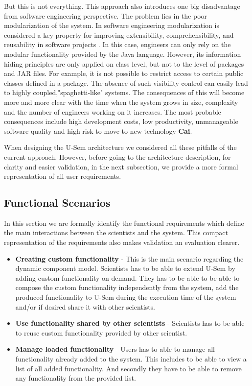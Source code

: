 But this is not everything. This approach also introduces one big disadvantage from software engineering perspective. The problem lies in the poor modularization of the system. In software engineering modularization is considered a key property for improving extensibility, comprehensibility, and reusability in software projects \cite{Parnas}. In this case, engineers can only rely on the modular functionality provided by the Java language. However, its information hiding principles are only applied on class level, but not to the level of packages and JAR files. For example, it is not possible to restrict access to certain public classes defined in a package. The absence of such visibility control can easily lead to highly coupled,"spaghetti-like" systems. The consequences of this will become more and more clear with the time when the system grows in size, complexity and the number of engineers working on it increases. The most probable consequences include high development costs, low productivity, unmanageable software quality and high risk to move to new technology \textbf{Cai}.

When designing the U-Sem architecture we considered all these pitfalls of the current approach. However, before going to the architecture description, for clarity and easier validation, in the next subsection, we provide a more formal representation of all user requirements.


\subsection{Functional Scenarios}
In this section we are formally identify the functional requirements which define the main interactions between the scientists and the system. This compact representation of the requirements also makes validation an evaluation clearer. 

\begin{itemize}

	\item \textbf{Creating custom functionality} - This is the main scenario regarding the dynamic component model. Scientists has to be able to extend U-Sem by adding custom functionality on demand. They has to be able to be able to compose the custom functionality independently from the system, add the produced functionality to U-Sem during the execution time of the system and/or if desired share it with other scientists.
	
	\item \textbf{Use functionality shared by other scientists} - Scientists has to be able to reuse custom functionality provided by other scientist.
	
	\item \textbf{Manage loaded functionality} - Users has to able to manage all functionality already added to the system. This includes to be able to view a list of all added functionality. And secondly they have to be able to remove any functionality from the provided list.
			
	
\end{itemize}


